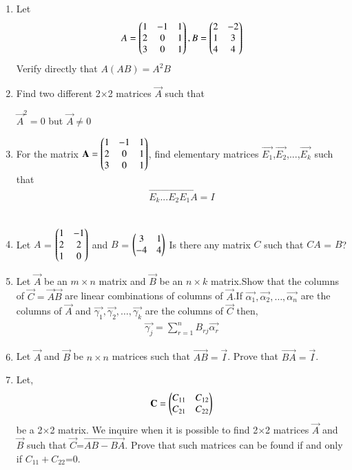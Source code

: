 \renewcommand{\theequation}{\theenumi}
\renewcommand{\thefigure}{\theenumi}
\begin{enumerate}[label=\thesubsection.\arabic*.,ref=\thesubsection.\theenumi]
%
\item Let
\begin{align}
   A=\begin{pmatrix}1&-1&1\\2&0&1\\3&0&1\end{pmatrix}, B=\begin{pmatrix}2&-2\\1&3\\4&4\end{pmatrix}
\end{align}
Verify directly that $ A(AB)=A^2B $
%
\solution

%

%
\item Find two different 2$\times$2 matrices $\vec{A}$ such that 

$\vec{A}^{2}=0$ but $\vec{A}\ne0$
%
\\
\solution

%
\item For the matrix $\mathbf{A}= \begin{pmatrix}1 & -1 & 1 \\ 2 & 0 & 1 \\ 3 & 0 & 1\end{pmatrix}$, find elementary matrices $\vec{E_1}$,$\vec{E_2}$,...,$\vec{E_k}$ such that
\begin{align}
	\vec{E_k...E_2E_1A = I}
\end{align}
%
\\
\solution

\item Let $A$ = $\begin{pmatrix}1 & -1\\2 & 2\\1 & 0\end{pmatrix}$ and $B$ = $\begin{pmatrix}3 & 1\\-4 & 4\end{pmatrix}$
Is there any matrix $C$ such that $CA$ = $B$?
\\
\solution

\item Let $\vec{A}$ be an $m \times n$ matrix and $\vec{B}$ be an $n \times k$ matrix.Show that the columns of $\vec{C}=\vec{A}\vec{B}$ are linear combinations of columns of $\vec{A}$.If $\vec{\alpha_1},\vec{\alpha_2},\hdots,\vec{\alpha_n}$ are the columns of $\vec{A}$ and $\vec{\gamma_1},\vec{\gamma_2},\hdots,\vec{\gamma_k}$ are the columns of $\vec{C}$ then,
\begin{align}
    \vec{\gamma_j}= \sum_{r=1}^{n}B_{rj}\vec{\alpha_r} 
\end{align}
%
\solution

%
\item Let $\vec{A}$ and $\vec{B}$ be $n \times n$ matrices such that $\vec{AB}=\vec{I}$. Prove that $\vec{BA}=\vec{I}$.
%
\solution

%
\item Let,
\begin{align}
\mathbf{C}=\begin{pmatrix}C_{11}&C_{12}\\C_{21}&C_{22}\end{pmatrix}
\end{align}
be a 2$\times$2 matrix. We inquire when it is possible to find 2$\times$2 matrices $\vec{A}$ and $\vec{B}$ such that $\vec{C}$=$\vec{AB-BA}$. Prove that such matrices can be found if and only if $C_{11}+C_{22}$=0.
%
\solution



\end{enumerate}
